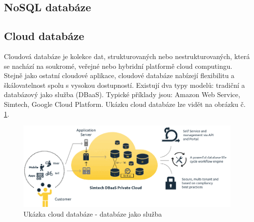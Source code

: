 \subsection{NoSQL databáze}
\subsection{Cloud databáze}
Cloudová databáze je kolekce dat, strukturovaných nebo nestrukturovaných, která se nachází na soukromé, veřejné nebo hybridní platformě cloud computingu. Stejně jako ostatní cloudové aplikace, cloudové databáze nabízejí flexibilitu a škálovatelnost spolu s vysokou dostupností. Existují dva typy modelů: tradiční a databázový jako služba (DBaaS). Typické příklady jsou: Amazon Web Service, Simtech, Google Cloud Platform. Ukázku cloud databáze lze vidět na obrázku č. \ref{fig:db_img_cloud}.
	\begin{figure}[H]
	\centering
	\includegraphics[width=15cm]{img/databaze/cloud_db}
	\caption{Ukázka cloud databáze - databáze jako služba}
	\label{fig:db_img_cloud}
	\end{figure}

